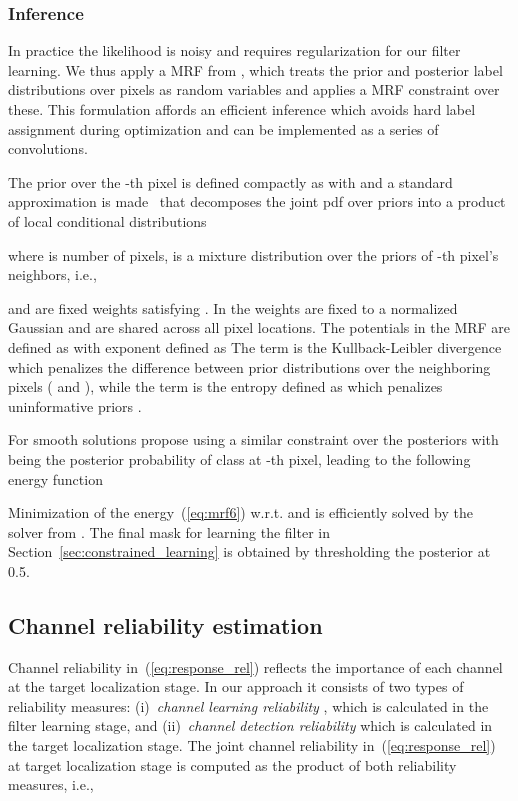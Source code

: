 \documentclass[twocolumn]{article}
\begin{document}
\subsubsection{Inference}  \label{sec:mrf_inference}

In practice the likelihood  is noisy and requires regularization for our filter learning. We thus apply a MRF from \citep{diplaros_genmodel,kristan_tcyb2016}, which treats the prior and posterior label distributions over pixels as random variables and applies a MRF constraint over these. This formulation affords an efficient inference which avoids hard label assignment during optimization and can be implemented as a series of convolutions. 

The prior over the -th pixel is defined compactly as  with  and a standard approximation is made~\citep{diplaros_genmodel} that decomposes the joint pdf over priors  into a product of local conditional distributions

where  is number of pixels,  is a mixture distribution over the priors of -th pixel's neighbors, i.e., 

and  are fixed weights satisfying . In \cite{diplaros_genmodel} the weights are fixed to a normalized Gaussian and are shared across all pixel locations. The potentials in the MRF are defined as 
with exponent defined as
The term  is the Kullback-Leibler divergence which penalizes the difference between prior distributions over the neighboring pixels ( and ), while the term  is the entropy defined as 
which penalizes uninformative priors .

For smooth solutions \cite{diplaros_genmodel} propose using a similar constraint over the posteriors  with  being the posterior probability of class  at -th pixel, leading to the following energy function 

Minimization of the energy~(\ref{eq:mrf6}) w.r.t.  and  is efficiently solved by the solver from \cite{diplaros_genmodel}. The final mask  for learning the filter in Section~\ref{sec:constrained_learning} is obtained by thresholding the posterior at 0.5.

 
\subsection{Channel reliability estimation}\label{sec:chan_reliab}

Channel reliability  in~(\ref{eq:response_rel}) reflects the importance of each channel at the target localization stage. In our approach it consists of two types of reliability measures: (i)~{\it channel learning reliability} , which is calculated in the filter learning stage, and (ii)~{\it channel detection reliability}  which is calculated in the target localization stage. The joint channel reliability  in~(\ref{eq:response_rel}) at target localization stage is computed as the product of both reliability measures, i.e.,
\end{document}
